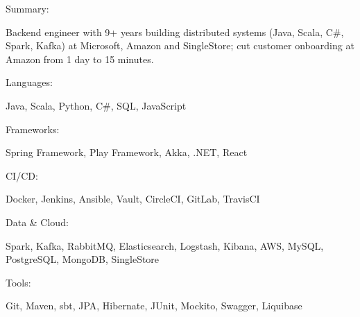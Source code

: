 
\begin{cvskills}

\cvskill
    {Summary:}
    {
      \begin{cvitems} %
        \item {Backend engineer with 9+ years building distributed systems (Java, Scala, C\#, Spark, Kafka) at Microsoft, Amazon and SingleStore; cut customer onboarding at Amazon from 1 day to 15 minutes.}
      \end{cvitems}
    }

\cvskill
    {Languages:}
    {
      \begin{cvitems} %
        \item {Java, Scala, Python, C\#, SQL, JavaScript}
      \end{cvitems}
    }

\cvskill
    {Frameworks:}
    {
      \begin{cvitems} %
        \item {Spring Framework, Play Framework, Akka, .NET, React}
      \end{cvitems}
    }

\cvskill
    {CI/CD:}
    {
      \begin{cvitems} %
        \item {Docker, Jenkins, Ansible, Vault, CircleCI, GitLab, TravisCI}
      \end{cvitems}
    }
    
\cvskill
    {Data \& Cloud:}
    {
      \begin{cvitems} %
        \item {Spark, Kafka, RabbitMQ, Elasticsearch, Logstash, Kibana, AWS, MySQL, PostgreSQL, MongoDB, SingleStore}
      \end{cvitems}
    }

\cvskill
    {Tools:}
    {
      \begin{cvitems} %
        \item {Git, Maven, sbt, JPA, Hibernate, JUnit, Mockito, Swagger, Liquibase}
      \end{cvitems}
    }
\end{cvskills}
